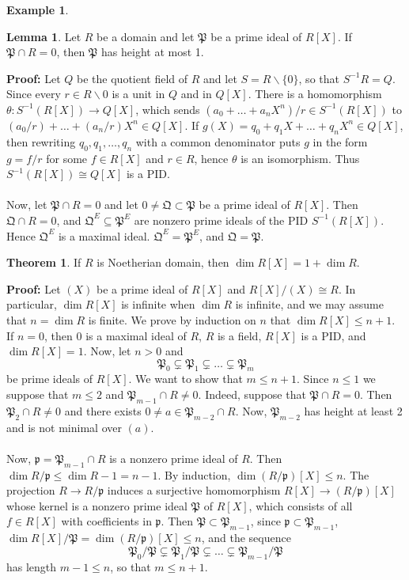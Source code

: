 \documentclass[11pt]{amsbook}%
\theoremstyle{plain}
\theoremstyle{definition}
\newtheorem*{example*}{Example}
\newtheorem{lemma}{Lemma}
\newtheorem{theorem}{Theorem}
\numberwithin{equation}{section}
\newcommand{\pf}{\mathfrak p}
\newcommand{\PF}{\mathfrak P}
\newcommand{\QF}{\mathfrak Q}
\renewcommand{\proof}{ \textbf{Proof: }}
\begin{document}
\begin{example*}
\begin{lemma}
  Let $R$ be a domain and let $\PF$ be a prime ideal of $R[X]$. If
  $\PF \cap R = 0$, then $\PF$ has height at most 1.
\end{lemma} \vspace{1.8em}
\proof Let $Q$ be the quotient field of $R$ and let $S = R \backslash \{0\}$,
so that $S^{-1}R = Q$. Since every $r \in R \backslash 0$ is a unit in
$Q$ and in $Q[X]$. There is a homomorphism $\theta: S^{-1}(R[X]) \longrightarrow Q[X]$, which
sends $(a_{0} + \dots + a_{n}X^{n})/r \in S^{-1}(R[X])$ to $(a_{0}/r) + \dots + (a_{n}/r)X^{n} \in Q[X]$.
If $g(X) = q_{0} + q_{1}X + \dots + q_{n}X^{n} \in Q[X]$, then rewriting $q_{0}, q_{1}, \dots, q_{n}$
with a common denominator puts $g$ in the form $g = f/r$ for some $f \in R[X]$ and 
$r \in R$, hence $\theta$ is an isomorphism. Thus $S^{-1}(R[X]) \cong Q[X]$ is a PID. \\ \\
Now, let $\PF \cap R = 0$ and let $0 \neq \QF \subset \PF$ be a prime ideal of $R[X]$.
Then $\QF \cap R = 0$, and $\QF^{E} \subseteq \PF^{E}$ are nonzero prime ideals of
the PID $S^{-1}(R[X])$. Hence $\QF^{E}$ is a maximal ideal. $\QF^{E} = \PF^{E}$, and
$\QF = \PF$. \qedsymbol

\begin{theorem}
  If $R$ is Noetherian domain, then $\dim R[X] = 1 + \dim R$.
\end{theorem} \vspace{1.8em}
\proof Let $(X)$ be a prime ideal of $R[X]$ and $R[X]/(X) \cong R$. In particular,
$\dim R[X]$ is infinite when $\dim R$ is infinite, and we may assume that $n = \dim R$ is finite.
We prove by induction on $n$ that $\dim R[X] \leq n+1$. If $n = 0$, then 0 is a maximal ideal of
$R$, $R$ is a field, $R[X]$ is a PID, and $\dim R[X] = 1$. Now, let $n > 0$ and
$$
\PF_{0} \subsetneq \PF_{1} \subsetneq \dots \subsetneq \PF_{m}
$$
be prime ideals of $R[X]$. We want to show that $m \leq n+1$. Since $n \leq 1$ we suppose that $m \leq 2$
and $\PF_{m-1} \cap R \neq 0$. Indeed, suppose that $\PF \cap R = 0$. Then $\PF_{2} \cap R \neq 0$
and there exists $0 \neq a \in \PF_{m-2} \cap R$. Now, $\PF_{m-2}$ has height at least 2
and is not minimal over $(a)$.  \\ \\
Now, $\pf = \PF_{m-1} \cap R$ is a nonzero prime ideal of $R$. Then $\dim R/\pf \leq \dim R-1 = n-1$.
By induction, $\dim (R/\pf)[X] \leq n$. The projection $R \longrightarrow R/\pf$ induces
a surjective homomorphism $R[X] \longrightarrow (R/\pf)[X]$ whose kernel is a nonzero prime ideal
$\PF$ of $R[X]$, which consists of all $f \in R[X]$ with coefficients in $\pf$. Then $\PF \subset \PF_{m-1}$,
since $\pf \subset \PF_{m-1}$, $\dim R[X]/\PF = \dim(R/\pf)[X] \leq n$, and the sequence
$$
\PF_{0}/\PF \subsetneq \PF_{1}/\PF \subsetneq \dots \subsetneq \PF_{m-1}/\PF
$$
has length $m-1 \leq n$, so that $m \leq n+1$. \qedsymbol


\end{example*}
\end{document}
